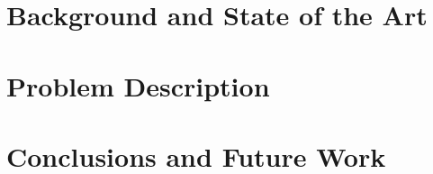 \documentclass[runningheads,a4paper]{llncs}
\begin{document}
\section{Background and State of the Art}
\label{sec:soa}




\section{Problem Description}
\label{sec:torcs}




%
\section{Conclusions and Future Work} 
\label{sec:conclusions}



\end{document}
